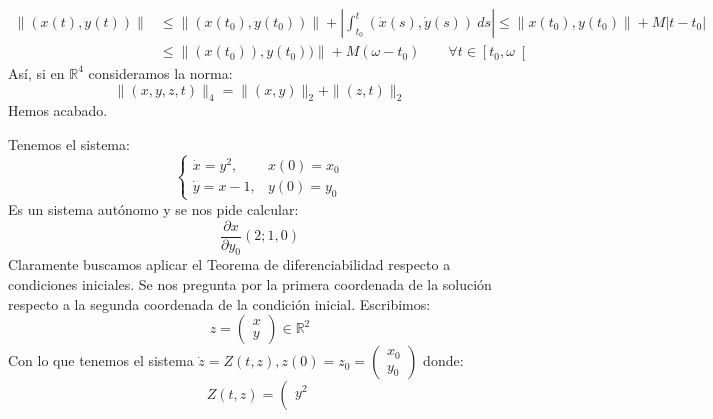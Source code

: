 \begin{ejercicio}
\begin{enumerate}[label=\alph*)]
\begin{align*}
                \|(x(t),y(t))\| &\leq \|(x(t_0),y(t_0))\| + \left|\int_{t_0}^{t} (\dot{x}(s), \dot{y}(s))~ds \right| \leq \|x(t_0),y(t_0)\| + M|t-t_0| \\
                                &\leq \|(x(t_0)),y(t_0))\| + M(\omega - t_0) \qquad \forall t\in \left[t_0,\omega\right[
            \end{align*}
            Así, si en $\mathbb{R}^4$ consideramos la norma:
            \begin{equation*}
                \|(x,y,z,t)\|_4 = \|(x,y)\|_2 + \|(z,t)\|_2
            \end{equation*}
            Hemos acabado.
    \end{enumerate}
\end{ejercicio}

\begin{ejercicio}
    Tenemos el sistema:
    \begin{equation*}
        \left\{\begin{array}{ll}
                \dot{x} = y^2, & x(0) = x_0 \\
                \dot{y} = x-1, & y(0) = y_0
        \end{array}\right.
    \end{equation*}
    Es un sistema autónomo y se nos pide calcular:
    \begin{equation*}
        \frac{\partial x}{\partial y_0}(2;1,0)
    \end{equation*}
    Claramente buscamos aplicar el Teorema de diferenciabilidad respecto a condiciones iniciales. Se nos pregunta por la primera coordenada de la solución respecto a la segunda coordenada de la condición inicial. Escribimos:
    \begin{equation*}
        z = \left(\begin{array}{cc}
            x \\
            y 
        \end{array}\right) \in \mathbb{R}^2
    \end{equation*}
    Con lo que tenemos el sistema $\dot{z} = Z(t,z), z(0) = z_0 = \left(\begin{array}{cc}
        x_0 \\
        y_0 
    \end{array}\right)$ donde:
    \begin{equation*}
        Z(t,z) = \left(\begin{array}{cc}
            y^2 \\

\end{array}
\end{equation*}
\end{ejercicio}
